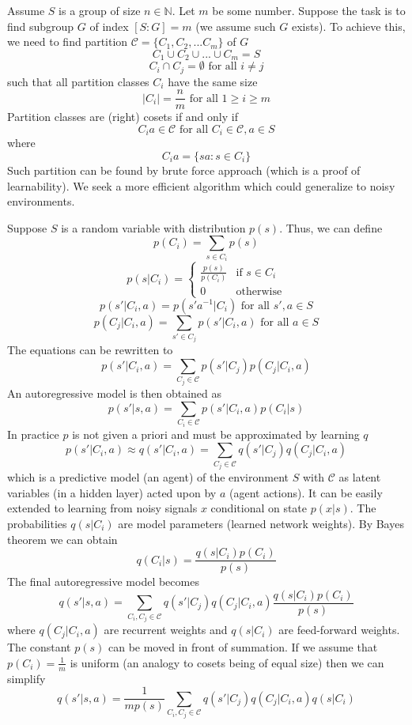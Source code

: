 \documentclass[oneside,english,logo]{amuthesis}
\begin{document}
Assume $S$ is a group of size $n\in \mathbb{N}$. Let $m$ be some number. Suppose the task is to find subgroup $G$ of index $[S:G]=m$ (we assume such $G$ exists). To achieve this, we need to find partition $\mathcal{C}=\{C_1,C_2,...C_m\}$ of $G$ 
\[
C_1\cup C_2\cup ... \cup C_m = S
\]
\[
C_i \cap C_j = \emptyset \text{ for all }i \ne j
\]
such that all partition classes $C_i$ have the same size
\[
|C_i|= \frac{n}{m}\text{ for all }1\ge i\ge m
\]
Partition classes are (right) cosets if and only if
\[
C_ia \in \mathcal{C} \text{ for all }C_i \in \mathcal{C} , a\in S
\]
where
\[
C_ia=\{sa : s\in C_i\}
\]
Such partition can be found by brute force approach (which is a proof of learnability). We seek a more efficient algorithm which could generalize to noisy environments.


Suppose $S$ is a random variable with distribution $p(s)$. Thus, we can define \[
p(C_i) = \sum_{s\in C_i} p(s)
\]
\[
p(s|C_i) = \begin{cases*}
	\frac{p(s)}{p(C_i)} & \text{if $s\in C_i$} \\
	0 & \text{otherwise}
\end{cases*}
\]
\[
p(s'|C_i,a) = p(s'a^{-1}|C_i) \text{ for all }s',a\in S
\]
\[
p(C_j|C_i,a) = \sum_{s' \in C_j} p(s'|C_i,a)\text{ for all }a\in S
\]
The equations can be rewritten to
\[
p(s'|C_i,a) = \sum_{C_j\in \mathcal{C}} p(s'|C_j)p(C_j|C_i,a)
\]
An autoregressive model is then obtained as
\[
p(s'|s,a) = \sum_{C_i\in \mathcal{C}} p(s'|C_i,a)p(C_i|s) 
\]
In practice $p$ is not given a priori and must be approximated by learning $q$
\[
p(s'|C_i,a) \approx q(s'|C_i,a) = \sum_{C_j\in \mathcal{C}} q(s'|C_j)q(C_j|C_i,a)
\]
which is a predictive model (an agent) of the environment $S$ with $\mathcal{C}$ as latent variables (in a hidden layer) acted upon by $a$ (agent actions). It can be easily extended to learning from noisy signals $x$ conditional on state $p(x|s)$. The probabilities $q(s|C_i)$ are model parameters (learned network weights). By Bayes theorem we can obtain 
\[
q(C_i|s) = \frac{q(s|C_i)p(C_i)}{p(s)}
\]
The final autoregressive model becomes
\[
q(s'|s,a) = \sum_{C_i,C_j\in \mathcal{C}} q(s'|C_j)q(C_j|C_i,a) \frac{q(s|C_i)p(C_i)}{p(s)}
\]
where $q(C_j|C_i,a)$ are recurrent weights and $q(s|C_i)$ are feed-forward weights. The constant $p(s)$ can be moved in front of summation. If we assume that $p(C_i)=\frac{1}{m}$ is uniform (an analogy to cosets being of equal size) then we can simplify
\[
q(s'|s,a) = \frac{1}{mp(s)} \sum_{C_i,C_j\in \mathcal{C}} q(s'|C_j)q(C_j|C_i,a)q(s|C_i)
\]
\end{document}
